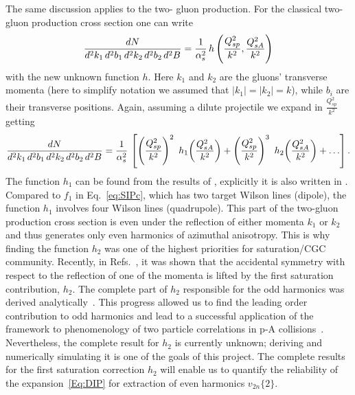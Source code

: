  
The same discussion  applies to the two- gluon production. For the
classical two-gluon production cross section one can write
\begin{align}
	\frac{dN}{d^2 k_1 \, d^2 b_1 \, d^2 k_2 \, d^2 b_2 \, d^2 B} 
  = \frac{1}{\alpha_s^2} \, h
  \left( 
  \frac{Q_{sp}^2}{k^2},  	 
   \frac{Q_{sA}^2}{k^2}  	 
  \right)
 \end{align}
 with the new unknown function $h$. Here $k_1$ and $k_2$ are the
 gluons' transverse momenta (here to simplify notation 
 we assumed that $|k_1|=|k_2|=k$), while $b_i$ are their
 transverse positions. Again, assuming a dilute projectile we expand
 in $\frac{Q_{sp}^2}{k^2}$ getting
\begin{align}
  \frac{dN}{d^2 k_1 \, d^2 b_1 \, d^2 k_2 \, d^2 b_2 \, d^2 B} =
  \frac{1}{\as^2} \, \left[ \left( \frac{Q_{sp}^2}{k^2}  \right)^2 \ 
	  h_1
    \!\left(  \frac{Q_{sA}^2}{k^2} \right) + \left( \frac{Q_{sp}^2}{k^2}  \right)^3 \ h_2 \! \left( \frac{Q_{sA}^2}{k^2}  \right) + \ldots
  \right] .
  \label{Eq:DIP}
\end{align}
The function $h_1$ can be found from the results of
\myrefs\cite{Kovner:2012jm,Kovchegov:2012nd}, 
explicitly it is also written in \myrefs\cite{Kovner:2018fxj}. 
Compared to $f_1$ in Eq.~\eqref{eq:SIPc}, which has two target Wilson lines (dipole), 
the function $h_1$ involves four Wilson lines (quadrupole). 
This
part of the two-gluon production cross section is even 
under the reflection of either momenta $k_1$ or $k_2$ and thus 
generates  only even harmonics of azimuthal anisotropy. This is why finding the function $h_2$ 
was one of the highest priorities for saturation/CGC community. 
Recently, in Refs.~\cite{McLerran:2016snu,Kovchegov:2018jun},
it was shown that the accidental symmetry with respect to the 
reflection of one of the momenta is lifted by the 
first saturation contribution, $h_2$. 
The complete part of $h_2$ responsible for the
odd harmonics was derived analytically~\cite{McLerran:2016snu,Kovchegov:2018jun}. 
This progress allowed us to find the leading order contribution to odd harmonics and lead to 
a  
successful application of the framework to phenomenology of two particle correlations in p-A 
collisions~\cite{Mace:2018vwq,Mace:2018yvl}.
Nevertheless, the complete result for $h_2$ is currently unknown; 
deriving and numerically simulating it is one  of the goals of this project.
The complete results for the first saturation correction $h_2$
will enable us to quantify the reliability of the expansion~\eqref{Eq:DIP}
for extraction of even harmonics  $v_{2n}\{2\}$. 

